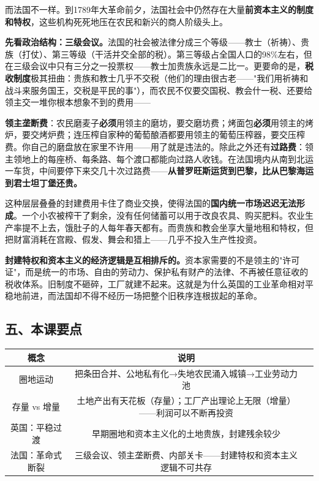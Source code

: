 \documentclass[a4paper,12pt]{ctexart}
\begin{document}
而法国不一样。到1789年大革命前夕，法国社会中仍然存在大量\textbf{前资本主义的制度和特权}，这些机构死死地压在农民和新兴的商人阶级头上。

\textbf{先看政治结构：三级会议。}法国的社会被法律分成三个等级——教士（祈祷）、贵族（打仗）、第三等级（干活并交全部的税）。第三等级占全国人口的98\%左右，但在三级会议中只有三分之一投票权——教士加贵族永远是二比一。更要命的是，\textbf{税收制度}极其扭曲：贵族和教士几乎不交税（他们的理由很古老——"我们用祈祷和战斗来服务国王，交税是平民的事"），而农民不仅要交国税、教会什一税、还要给领主交一堆你根本想象不到的费用——

\textbf{领主垄断费}：农民磨麦子\textbf{必须}用领主的磨坊，要交磨坊费；烤面包\textbf{必须}用领主的烤炉，要交烤炉费；连压榨自家种的葡萄酿酒都要用领主的葡萄压榨器，要交压榨费。你自己的磨盘放在家里不许用——用了就是违法的。除此之外还有\textbf{过路费}：领主领地上的每座桥、每条路、每个渡口都能向过路人收钱。在法国境内从南到北运一车货，中间要停下来交几十次过路费——\textbf{从普罗旺斯运货到巴黎，比从巴黎海运到君士坦丁堡还贵。}

这种层层叠叠的封建费用卡住了商业交换，使得法国的\textbf{国内统一市场迟迟无法形成}。一个小农被榨干了剩余，没有任何储蓄可以用于改良农具、购买肥料。农业生产率提不上去，饿肚子的人每年春天都有。而贵族和教会坐享大量地租和特权，但把财富消耗在宫殿、假发、舞会和猎上——几乎不投入生产性投资。

\textbf{封建特权和资本主义的经济逻辑是互相排斥的。}资本家需要的不是领主的"许可证"，而是统一的市场、自由的劳动力、保护私有财产的法律、不再被任意征收的税收体系。旧制度不砸碎，工厂就建不起来。这就是为什么英国的工业革命相对平稳地前进，而法国却不得不经历一场把整个旧秩序连根拔起的革命。

\subsection*{五、本课要点}

\begin{center}
\begin{tabular}{|c|c|p{7cm}|}
\hline
\textbf{概念} & \textbf{说明} \\
\hline
圈地运动 & 把条田合并、公地私有化→失地农民涌入城镇→工业劳动力池 \\
\hline
存量 vs 增量 & 土地产出有天花板（存量）；工厂产出理论上无限（增量）——利润可以不断再投资 \\
\hline
英国：平稳过渡 & 早期圈地和资本主义化的土地贵族，封建残余较少 \\
\hline
法国：革命式断裂 & 三级会议、领主垄断费、内部关卡——封建特权和资本主义逻辑不可共存 \\
\hline
\end{tabular}
\end{center}
\end{document}
